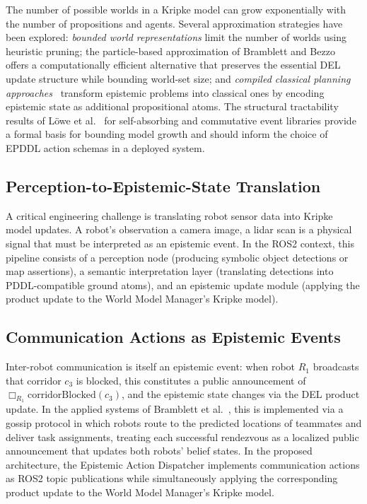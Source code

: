 \documentclass[12pt,a4paper]{article}
\theoremstyle{definition}
\theoremstyle{plain}
\begin{document}
The number of possible worlds in a Kripke model can grow exponentially with the number of
propositions and agents. Several approximation strategies have been explored: \textit{bounded
world representations} limit the number of worlds using heuristic pruning; the particle-based
approximation of Bramblett and Bezzo~\cite{bramblett2023frontiers} offers a computationally
efficient alternative that preserves the essential DEL update structure while bounding world-set
size; and \textit{compiled classical planning approaches}~\cite{muise2015planning} transform
epistemic problems into classical ones by encoding epistemic state as additional propositional
atoms. The structural tractability results of L{\"o}we et al.~\cite{lowe2010planning} for
self-absorbing and commutative event libraries provide a formal basis for bounding model growth
and should inform the choice of EPDDL action schemas in a deployed system.

\subsection{Perception-to-Epistemic-State Translation}

A critical engineering challenge is translating robot sensor data into Kripke model updates. A
robot's observation a camera image, a lidar scan is a physical signal that must be interpreted
as an epistemic event. In the ROS2 context, this pipeline consists of a perception node
(producing symbolic object detections or map assertions), a semantic interpretation layer
(translating detections into PDDL-compatible ground atoms), and an epistemic update module
(applying the product update to the World Model Manager's Kripke model).

\subsection{Communication Actions as Epistemic Events}

Inter-robot communication is itself an epistemic event: when robot $R_1$ broadcasts that corridor
$c_3$ is blocked, this constitutes a public announcement of $\Box_{R_1}\mathrm{corridorBlocked}(c_3)$,
and the epistemic state changes via the DEL product update. In the applied systems of Bramblett
et al.~\cite{bramblett2023icra, bramblett2023frontiers}, this is implemented via a gossip protocol
in which robots route to the predicted locations of teammates and deliver task assignments,
treating each successful rendezvous as a localized public announcement that updates both robots'
belief states. In the proposed architecture, the Epistemic Action Dispatcher implements
communication actions as ROS2 topic publications while simultaneously applying the corresponding
product update to the World Model Manager's Kripke model.
\end{document}
